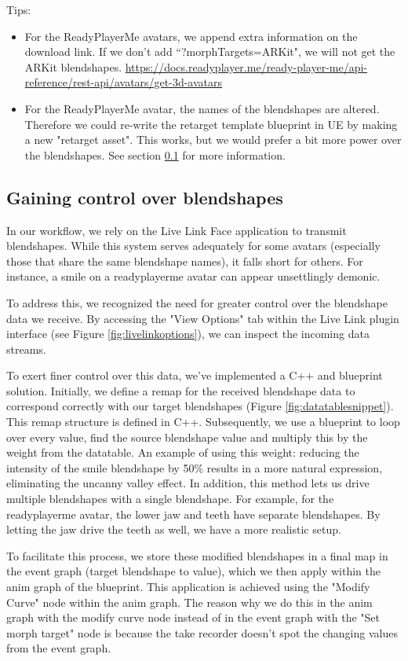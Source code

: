 \documentclass{uva-inf-article}
\begin{document}
Tips:
\begin{itemize}
    \item For the ReadyPlayerMe avatars, we append extra information on the download link. If we don't add ``?morphTargets=ARKit", we will not get the ARKit blendshapes.
    \url{https://docs.readyplayer.me/ready-player-me/api-reference/rest-api/avatars/get-3d-avatars}
    \item For the ReadyPlayerMe avatar, the names of the blendshapes are altered. Therefore we could re-write the retarget template blueprint in UE by making a new "retarget asset". This works, but we would prefer a bit more power over the blendshapes. See section \ref{blendshapescontrol} for more information.
\end{itemize}

\subsection{Gaining control over blendshapes}\label{blendshapescontrol}
In our workflow, we rely on the Live Link Face application to transmit blendshapes. While this system serves adequately for some avatars (especially those that share the same blendshape names), it falls short for others. For instance, a smile on a readyplayerme avatar can appear unsettlingly demonic.

To address this, we recognized the need for greater control over the blendshape data we receive. By accessing the "View Options" tab within the Live Link plugin interface (see Figure \ref{fig:livelinkoptions}), we can inspect the incoming data streams.

To exert finer control over this data, we've implemented a C++ and blueprint solution. Initially, we define a remap for the received blendshape data to correspond correctly with our target blendshapes (Figure \ref{fig:datatablesnippet}). This remap structure is defined in C++. Subsequently, we use a blueprint to loop over every value, find the source blendshape value and multiply this by the weight from the datatable. An example of using this weight: reducing the intensity of the smile blendshape by 50\% results in a more natural expression, eliminating the uncanny valley effect.
In addition, this method lets us drive multiple blendshapes with a single blendshape. For example, for the readyplayerme avatar, the lower jaw and teeth have separate blendshapes. By letting the jaw drive the teeth as well, we have a more realistic setup.

To facilitate this process, we store these modified blendshapes in a final map in the event graph (target blendshape to value), which we then apply within the anim graph of the blueprint. This application is achieved using the "Modify Curve" node within the anim graph. The reason why we do this in the anim graph with the modify curve node instead of in the event graph with the "Set morph target" node is because the take recorder doesn't spot the changing values from the event graph.
\end{document}
